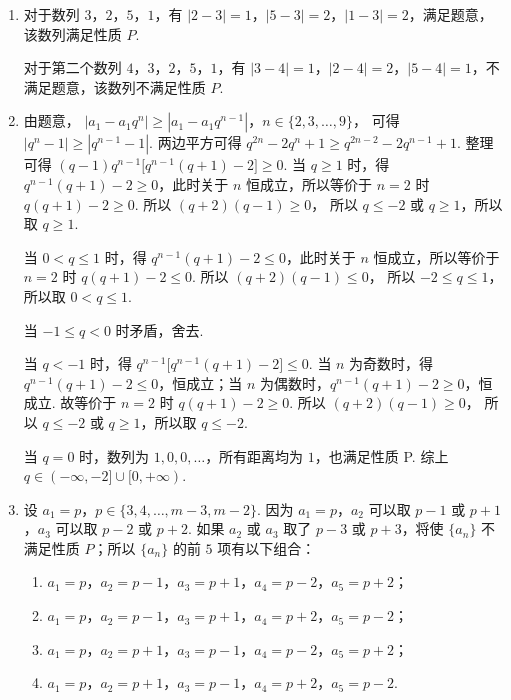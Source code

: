 \begin{solution}
\begin{enumerate}
\item 对于数列 \(3\)，\(2\)，\(5\)，\(1\)，有 \(|2-3|=1\)，\(|5-3|=2\)，\(|1-3|=2\)，满足题意，该数列满足性质 \(P\).

对于第二个数列 \(4\)，\(3\)，\(2\)，\(5\)，\(1\)，有 \(|3-4|=1\)，\(|2-4|=2\)，\(|5-4|=1\)，不满足题意，该数列不满足性质 \(P\).

\item 由题意，
\(|a_1-a_1q^n|\ge|a_1-a_1q^{n-1}|\)，\(n\in\{2,3,\ldots,9\}\)，
可得
\(|q^n-1|\ge|q^{n-1}-1|\).
两边平方可得
\(q^{2n}-2q^n+1\ge q^{2n-2}-2q^{n-1}+1\).
整理可得
\((q-1)q^{n-1}\big[q^{n-1}(q+1)-2\big]\ge0\).
当 \(q\ge1\) 时，得 \(q^{n-1}(q+1)-2\ge0\)，此时关于 \(n\) 恒成立，所以等价于 \(n=2\) 时 \(q(q+1)-2\ge0\).
所以
\((q+2)(q-1)\ge0\)，
所以 \(q\le-2\) 或 \(q\ge1\)，所以取 \(q\ge1\).

当 \(0<q\le1\) 时，得 \(q^{n-1}(q+1)-2\le0\)，此时关于 \(n\) 恒成立，所以等价于 \(n=2\) 时 \(q(q+1)-2\le0\).
所以
\((q+2)(q-1)\le0\)，
所以 \(-2\le q\le1\)，所以取 \(0<q\le1\).

当 \(-1\le q<0\) 时矛盾，舍去.

当 \(q<-1\) 时，得
\(q^{n-1}\big[q^{n-1}(q+1)-2\big]\le0\).
当 \(n\) 为奇数时，得 \(q^{n-1}(q+1)-2\le0\)，恒成立；当 \(n\) 为偶数时，\(q^{n-1}(q+1)-2\ge0\)，恒成立. 故等价于 \(n=2\) 时 \(q(q+1)-2\ge0\).
所以
\((q+2)(q-1)\ge0\)，
所以 \(q\le-2\) 或 \(q\ge1\)，所以取 \(q\le-2\).

当 \(q=0\) 时，数列为 \(1,0,0,\ldots\)，所有距离均为 \(1\)，也满足性质 P. 综上
\(q\in(-\infty,-2]\cup[0,+\infty)\).

\item 设 \(a_1=p\)，\(p\in\{3,4,\ldots,m-3,m-2\}\).
因为 \(a_1=p\)，\(a_2\) 可以取 \(p-1\) 或 \(p+1\)，\(a_3\) 可以取 \(p-2\) 或 \(p+2\).
如果 \(a_2\) 或 \(a_3\) 取了 \(p-3\) 或 \(p+3\)，将使 \(\{a_n\}\) 不满足性质 \(P\)；所以 \(\{a_n\}\) 的前 \(5\) 项有以下组合：

\begin{enumerate}
\item \(a_1=p\)，\(a_2=p-1\)，\(a_3=p+1\)，\(a_4=p-2\)，\(a_5=p+2\)；

\item \(a_1=p\)，\(a_2=p-1\)，\(a_3=p+1\)，\(a_4=p+2\)，\(a_5=p-2\)；

\item \(a_1=p\)，\(a_2=p+1\)，\(a_3=p-1\)，\(a_4=p-2\)，\(a_5=p+2\)；

\item \(a_1=p\)，\(a_2=p+1\)，\(a_3=p-1\)，\(a_4=p+2\)，\(a_5=p-2\).
\end{enumerate}


\end{enumerate}
\end{solution}

